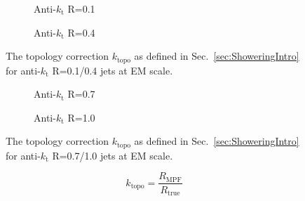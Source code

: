 \begin{figure}[!ht]
  \centering
  \begin{subfigure}{.5\textwidth}
    \centering
    \caption{Anti-$k_\mathrm{t}$ R=0.1}
  \end{subfigure}%
  \begin{subfigure}{.5\textwidth}  \centering
    \caption{Anti-$k_\mathrm{t}$ R=0.4}
  \end{subfigure}
  \caption[Topology correction using anti-$k_\mathrm{t}$ R=0.1/0.4 jets]
{\small The topology correction $k_{\mathrm {topo}}$ as defined in Sec.~\ref{sec:ShoweringIntro} for anti-$k_\mathrm{t}$ R=0.1/0.4 jets at EM scale.  }
  \label{Fig:TopoCorr_1-4}
\end{figure}

\begin{figure}[!ht]
  \centering
  \begin{subfigure}{.5\textwidth}
    \centering
    \caption{Anti-$k_\mathrm{t}$ R=0.7}
  \end{subfigure}%
  \begin{subfigure}{.5\textwidth}  \centering
    \caption{Anti-$k_\mathrm{t}$ R=1.0}
  \end{subfigure}
  \caption[Topology correction using anti-$k_\mathrm{t}$ R=0.7/1.0 jets]
{\small The topology correction $k_{\mathrm {topo}}$ as defined in Sec.~\ref{sec:ShoweringIntro} for anti-$k_\mathrm{t}$ R=0.7/1.0 jets at EM scale.  }
  \label{Fig:TopoCorr_7-10}
\end{figure}

\begin{equation}
  k_{\mathrm{topo}} = \frac{R_{\mathrm{MPF}}}{R_{\mathrm{true}}}
\end{equation}


